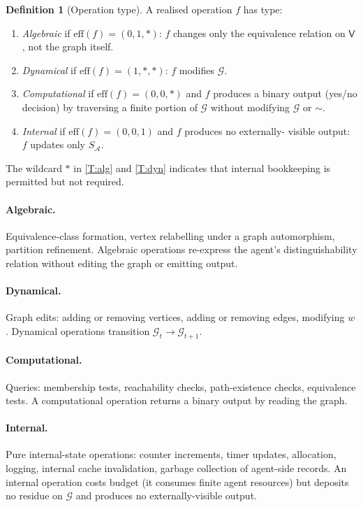 \documentclass[11pt,a4paper]{article}
\theoremstyle{thmstyle}
\theoremstyle{definition}
\newtheorem{definition}[theorem]{Definition}
\theoremstyle{remark}
\newcommand{\Graph}{\mathcal{G}}
\newcommand{\Vrt}{\mathsf{V}}
\newcommand{\Agent}{\mathcal{A}}
\begin{document}
\begin{definition}[Operation type]
\label{def:op_type}
A realised operation $f$ has type:
\begin{enumerate}[label=(T\arabic*),leftmargin=2.6em,nosep]
\item\label{T:alg} \emph{Algebraic} if
$\mathrm{eff}(f) = (0, 1, *)$: $f$ changes only the equivalence
relation on $\Vrt$, not the graph itself.
\item\label{T:dyn} \emph{Dynamical} if
$\mathrm{eff}(f) = (1, *, *)$: $f$ modifies $\Graph$.
\item\label{T:comp} \emph{Computational} if
$\mathrm{eff}(f) = (0, 0, *)$ and $f$ produces a binary output
(yes/no decision) by traversing a finite portion of $\Graph$
without modifying $\Graph$ or $\sim$.
\item\label{T:int} \emph{Internal} if
$\mathrm{eff}(f) = (0, 0, 1)$ and $f$ produces no externally-
visible output: $f$ updates only $S_\Agent$.
\end{enumerate}
The wildcard $*$ in \ref{T:alg} and \ref{T:dyn} indicates that
internal bookkeeping is permitted but not required.
\end{definition}

\paragraph{Algebraic.} Equivalence-class formation, vertex
relabelling under a graph automorphism, partition refinement.
Algebraic operations re-express the agent's distinguishability
relation without editing the graph or emitting output.

\paragraph{Dynamical.} Graph edits: adding or removing vertices,
adding or removing edges, modifying $w$. Dynamical operations
transition $\Graph_t \to \Graph_{t+1}$.

\paragraph{Computational.} Queries: membership tests, reachability
checks, path-existence checks, equivalence tests. A computational
operation returns a binary output by reading the graph.

\paragraph{Internal.} Pure internal-state operations: counter
increments, timer updates, allocation, logging, internal cache
invalidation, garbage collection of agent-side records. An internal
operation costs budget (it consumes finite agent resources) but
deposits no residue on $\Graph$ and produces no externally-visible
output.
\end{document}
